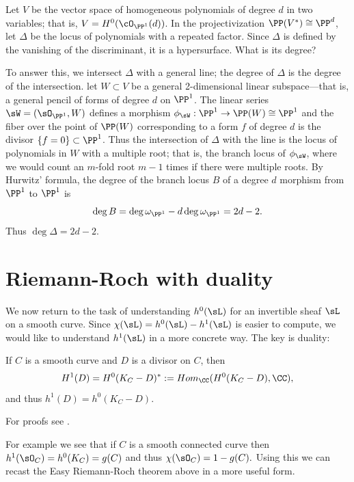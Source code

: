 \begin{example}
 Let $V$ be the vector space of homogeneous polynomials of degree $d$ in two variables; that is, $V = H^0(\cO_{\PP^1}(d))$. In the projectivization $\PP(V^{*}) \cong \PP^d$, let $\Delta$ be the locus of polynomials with a repeated factor. Since $\Delta$ is defined by the vanishing of the discriminant, it is a hypersurface. What is its degree?
 
 To answer this, we intersect $\Delta$ with a general line; the degree of $\Delta$ is the degree of the intersection.  let $W\subset V$ be a general 2-dimensional linear subspace---that is, a general pencil of forms of degree $d$ on $\PP^1$. The linear series $\sW = (\sO_{\PP^{1}}, W)$ defines a morphism $\phi_{\sW} : \PP^{1} \to \PP(W) \cong \PP^{1}$ and the fiber over the point of $\PP(W)$ corresponding to a form $f$ of degree $d$ is the divisor $\{f = 0\}\subset \PP^{1}$. Thus the intersection of $\Delta$ with the line is the locus of polynomials in $W$ with a multiple root; that is, the branch locus of $\phi_{\sW}$, where we would count an $m$-fold root $m-1$ times if there were multiple roots.
 By Hurwitz' formula, the degree of the branch locus $B$ of a degree $d$ morphism from $\PP^{1}$ to $\PP^{1}$ is
 $$
 \deg B = \deg \omega_{\PP^{1}} - d\deg \omega_{\PP^{1}} = 2d-2.
 $$
 Thus $\deg \Delta = 2d-2$.
 \end{example}
  

\section{Riemann-Roch with duality}

We now return to the task of understanding $h^0(\sL)$ for an invertible sheaf $\sL$ on a smooth curve. Since $\chi(\sL) = h^0(\sL)-h^1(\sL)$ is easier to compute, we would like to understand $h^1(\sL)$ in a more concrete way. The key is duality:
 
\begin{theorem}\label{sd}
If $C$ is a smooth curve and $D$ is a divisor on $C$, then
$$
H^1(D) =H^0(K_C-D)^* := Hom_\CC(H^0(K_C-D), \CC),
$$
and thus $h^1(D) = h^0(K_C-D)$.
\end{theorem}

For proofs see \cite[Theorem III.5.2 and III.7.6]{Hartshorne1977}. 

For example we see that if $C$ is a smooth connected curve then $h^1 (\sO_C) = h^0(K_C) = g(C)$ and thus $\chi(\sO_C) = 1-g(C).$   
Using this we can recast the Easy Riemann-Roch theorem above in a more useful form. 


